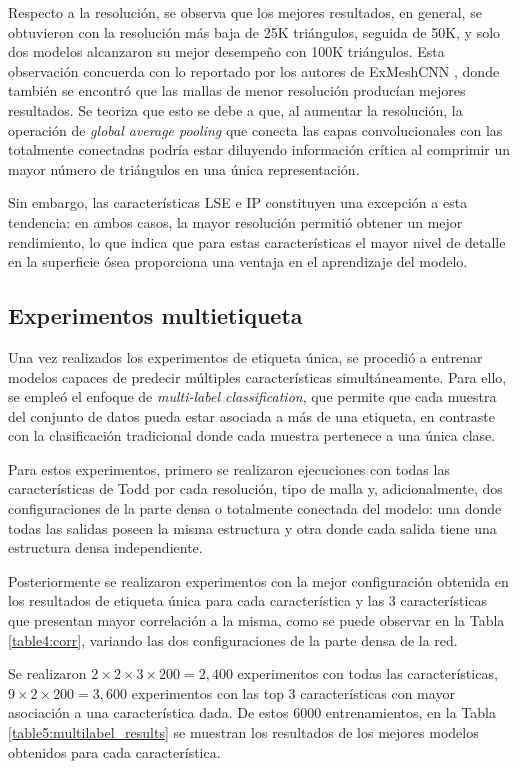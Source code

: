 Respecto a la resolución, se observa que los mejores resultados, en general, se obtuvieron con la resolución más baja de 25K triángulos, seguida de 50K, y solo dos modelos alcanzaron su mejor desempeño con 100K triángulos. Esta observación concuerda con lo reportado por los autores de ExMeshCNN \cite{kim_exmeshcnn_2022}, donde también se encontró que las mallas de menor resolución producían mejores resultados. Se teoriza que esto se debe a que, al aumentar la resolución, la operación de \textit{global average pooling} que conecta las capas convolucionales con las totalmente conectadas podría estar diluyendo información crítica al comprimir un mayor número de triángulos en una única representación.

Sin embargo, las características LSE e IP constituyen una excepción a esta tendencia: en ambos casos, la mayor resolución permitió obtener un mejor rendimiento, lo que indica que para estas características el mayor nivel de detalle en la superficie ósea proporciona una ventaja en el aprendizaje del modelo.

\subsection{Experimentos multietiqueta}
Una vez realizados los experimentos de etiqueta única, se procedió a entrenar modelos capaces de predecir múltiples características simultáneamente. Para ello, se empleó el enfoque de \textit{multi-label classification}, que permite que cada muestra del conjunto de datos pueda estar asociada a más de una etiqueta, en contraste con la clasificación tradicional donde cada muestra pertenece a una única clase.

Para estos experimentos, primero se realizaron ejecuciones con todas las características de Todd por cada resolución, tipo de malla y, adicionalmente, dos configuraciones de la parte densa o totalmente conectada del modelo: una donde todas las salidas poseen la misma estructura y otra donde cada salida tiene una estructura densa independiente.

Posteriormente se realizaron experimentos con la mejor configuración obtenida en los resultados de etiqueta única para cada característica y las 3 características que presentan mayor correlación a la misma, como se puede observar en la Tabla \ref{table4:corr}, variando las dos configuraciones de la parte densa de la red.

Se realizaron $2 \times 2 \times 3 \times 200 = 2,400$ experimentos con todas las características, $9 \times 2 \times 200 = 3,600$ experimentos con las top 3 características con mayor asociación a una característica dada. De estos 6000 entrenamientos, en la Tabla \ref{table5:multilabel_results} se muestran los resultados de los mejores modelos obtenidos para cada característica.

